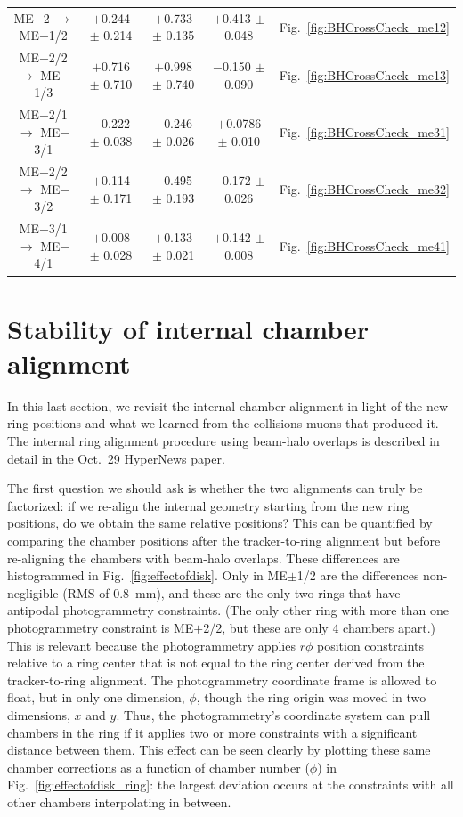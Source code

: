 \documentclass[12pt]{article}
\begin{document}
\begin{table}
\begin{center}
\begin{tabular}{c c c c c}
ME$-$2 $\to$ ME$-$1/2 & $+$0.244 $\pm$ 0.214 & $+$0.733 $\pm$ 0.135 & $+$0.413 $\pm$ 0.048 & Fig.~\ref{fig:BHCrossCheck_me12} \\
ME$-$2/2 $\to$ ME$-$1/3 & $+$0.716 $\pm$ 0.710 & $+$0.998 $\pm$ 0.740 & $-$0.150 $\pm$ 0.090 & Fig.~\ref{fig:BHCrossCheck_me13} \\
ME$-$2/1 $\to$ ME$-$3/1 & $-$0.222 $\pm$ 0.038 & $-$0.246 $\pm$ 0.026 & $+$0.0786 $\pm$ 0.010 & Fig.~\ref{fig:BHCrossCheck_me31} \\
ME$-$2/2 $\to$ ME$-$3/2 & $+$0.114 $\pm$ 0.171 & $-$0.495 $\pm$ 0.193 & $-$0.172 $\pm$ 0.026 & Fig.~\ref{fig:BHCrossCheck_me32} \\
ME$-$3/1 $\to$ ME$-$4/1 & $+$0.008 $\pm$ 0.028 & $+$0.133 $\pm$ 0.021 & $+$0.142 $\pm$ 0.008 & Fig.~\ref{fig:BHCrossCheck_me41} \\\hline
\end{tabular}
\end{center}
\end{table}

\section{Stability of internal chamber alignment}
\label{sec:stability}

In this last section, we revisit the internal chamber alignment in
light of the new ring positions and what we learned from the
collisions muons that produced it.  The internal ring alignment
procedure using beam-halo overlaps is described in detail in the
Oct.~29 HyperNews paper.

The first question we should ask is whether the two alignments can
truly be factorized: if we re-align the internal geometry starting
from the new ring positions, do we obtain the same relative positions?
This can be quantified by comparing the chamber positions after the
tracker-to-ring alignment but before re-aligning the chambers with
beam-halo overlaps.  These differences are histogrammed in
Fig.~\ref{fig:effectofdisk}.  Only in ME$\pm$1/2 are the differences
non-negligible (RMS of 0.8~mm), and these are the only two rings that
have antipodal photogrammetry constraints.  (The only other ring with
more than one photogrammetry constraint is ME$+$2/2, but these are
only 4 chambers apart.)  This is relevant because the photogrammetry
applies $r\phi$ position constraints relative to a ring center that is
not equal to the ring center derived from the tracker-to-ring
alignment.  The photogrammetry coordinate frame is allowed to float,
but in only one dimension, $\phi$, though the ring origin was moved in
two dimensions, $x$ and $y$.  Thus, the photogrammetry's coordinate
system can pull chambers in the ring if it applies two or more
constraints with a significant distance between them.  This effect can
be seen clearly by plotting these same chamber corrections as a
function of chamber number ($\phi$) in
Fig.~\ref{fig:effectofdisk_ring}: the largest deviation occurs at the
constraints with all other chambers interpolating in between.
\end{document}

